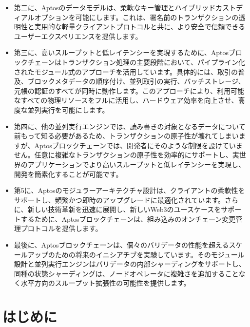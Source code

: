 \documentclass{article}
\begin{document}
\begin{CJK}{UTF8}{min}
\begin{itemize}
  \item 第二に、Aptosのデータモデルは、柔軟なキー管理とハイブリッドカストディアルオプションを可能にします。これは、署名前のトランザクションの透明性と実用的な軽量クライアントプロトコルと共に、より安全で信頼できるユーザーエクスペリエンスを提供します。
  
  \item 第三に、高いスループットと低レイテンシーを実現するために、Aptosブロックチェーンはトランザクション処理の主要段階において、パイプライン化されたモジュール式のアプローチを活用しています。具体的には、取引の普及、ブロックメタデータの順序付け、並列取引の実行、バッチストレージ、元帳の認証のすべてが同時に動作します。このアプローチにより、利用可能なすべての物理リソースをフルに活用し、ハードウェア効率を向上させ、高度な並列実行を可能にします。
  
  \item 第四に、他の並列実行エンジンでは、読み書きの対象となるデータについて前もって知る必要があるため、トランザクションの原子性が壊れてしまいますが、Aptosブロックチェーンでは、開発者にそのような制限を設けていません。任意に複雑なトランザクションの原子性を効率的にサポートし、実世界のアプリケーションでより高いスループットと低レイテンシーを実現し、開発を簡素化することが可能です。
  
 \item 第5に、Aptosのモジュラーアーキテクチャ設計は、クライアントの柔軟性をサポートし、頻繁かつ即時のアップグレードに最適化されています。さらに、新しい技術革新を迅速に展開し、新しいWeb3のユースケースをサポートするために、Aptosブロックチェーンは、組み込みのオンチェーン変更管理プロトコルを提供します。
 
 \item 最後に、Aptosブロックチェーンは、個々のバリデータの性能を超えるスケールアップのための将来のイニシアチブを実験しています。そのモジュール設計と並列実行エンジンはバリデータの内部シャーディングをサポートし、同種の状態シャーディングは、ノードオペレータに複雑さを追加することなく水平方向のスループット拡張性の可能性を提供します。
\end{itemize}

\end{CJK}

\section{はじめに}
\label{sec:introduction}
\end{document}
